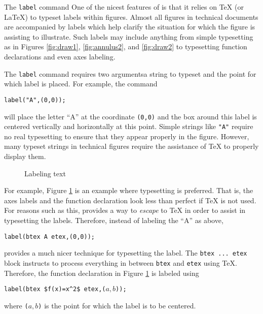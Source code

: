 \begin{subsection}{The \texttt{label} command}
One of the nicest features of \MP{} is that it relies on \TeX{} (or \LaTeX) to typeset labels within figures.  Almost all figures in technical documents are accompanied by labels which help clarify the situation for which the figure is assisting to illustrate.  Such labels may include anything from simple typesetting as in Figures \ref{fig:draw1}, \ref{fig:annulus2}, and \ref{fig:draw2} to typesetting function declarations and even axes labeling.

The \texttt{label} command requires two arguments\Dash a string to typeset and the point for which label is placed.  For example, the command \begin{center}\verb|label("A",(0,0));|\end{center} will place the letter ``A'' at the coordinate \texttt{(0,0)} and the box around this label is centered vertically and horizontally at this point.  Simple strings like \texttt{"A"} require no real typesetting to ensure that they appear properly in the figure.  However, many typeset strings in technical figures require the assistance of \TeX{} to properly display them.
\begin{figure}[hptb]
	\begin{center}\end{center}
	\caption{Labeling text}\label{fig:parabola}
\end{figure}
For example, Figure \ref{fig:parabola} is an example where typesetting is preferred.  That is, the axes labels and the function declaration look less than perfect if \TeX{} is not used.  For reasons such as this, \MP{} provides a way to \textit{escape} to \TeX{} in order to assist in typesetting the labels.  Therefore, instead of labeling the ``A'' as above, \begin{center}\verb|label(btex A etex,(0,0));|\end{center} provides a much nicer technique for typesetting the label.  The \texttt{btex\,...\,etex} block instructs \MP{} to process everything in between \texttt{btex} and \texttt{etex} using \TeX.  Therefore, the function declaration in Figure \ref{fig:parabola} is labeled using \begin{center}\verb|label(btex $f(x)=x^2$ etex,(|$a,b$\verb|));|\end{center} where \verb|(|$a,b$\verb|)| is the point for which the label is to be centered.


\end{subsection}
